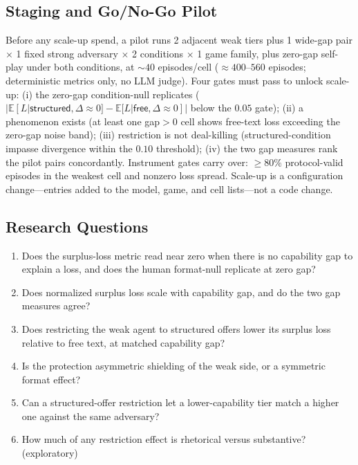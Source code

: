 \documentclass[conference]{IEEEtran}
\begin{document}
\subsection{Staging and Go/No-Go Pilot}
\label{sec:pilot}

Before any scale-up spend, a pilot runs 2 adjacent weak tiers plus 1 wide-gap pair $\times$ 1 fixed strong adversary $\times$ 2 conditions $\times$ 1 game family, plus zero-gap self-play under both conditions, at ${\sim}40$ episodes/cell (${\approx}400$--$560$ episodes; deterministic metrics only, no LLM judge). Four gates must pass to unlock scale-up: (i) the zero-gap condition-null replicates ($|\mathbb{E}[L|\textsf{structured},\Delta{\approx}0] - \mathbb{E}[L|\textsf{free},\Delta{\approx}0]|$ below the $0.05$ gate); (ii) a phenomenon exists (at least one gap${>}0$ cell shows free-text loss exceeding the zero-gap noise band); (iii) restriction is not deal-killing (structured-condition impasse divergence within the $0.10$ threshold); (iv) the two gap measures rank the pilot pairs concordantly. Instrument gates carry over: ${\geq}80\%$ protocol-valid episodes in the weakest cell and nonzero loss spread. Scale-up is a configuration change---entries added to the model, game, and cell lists---not a code change.

\subsection{Research Questions}

\begin{enumerate}[label=\textbf{RQ\arabic*.},leftmargin=2.6em]
\item Does the surplus-loss metric read near zero when there is no capability gap to explain a loss, and does the human format-null replicate at zero gap?
\item Does normalized surplus loss scale with capability gap, and do the two gap measures agree?
\item Does restricting the weak agent to structured offers lower its surplus loss relative to free text, at matched capability gap?
\item Is the protection asymmetric shielding of the weak side, or a symmetric format effect?
\item Can a structured-offer restriction let a lower-capability tier match a higher one against the same adversary?
\item How much of any restriction effect is rhetorical versus substantive? (exploratory)
\end{enumerate}
\end{document}
